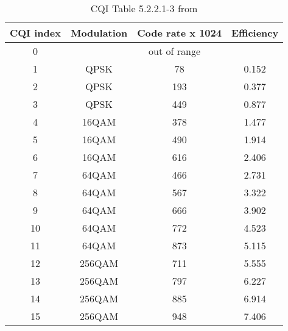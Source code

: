 \begin{table}[h]
    \centering
    \caption{\ac{CQI} Table 5.2.2.1-3 from \cite{3gpp-codebooks}}
    \label{tab:mcs}
    \begin{tabular}{|c|c|c|c|}
    \hline
    {\textbf{CQI index}} & {\textbf{Modulation}} & { \textbf{Code rate x 1024}} & {\textbf{Efficiency}} \\ \hline
    0                                      & \multicolumn{3}{c|}{out of range}                                                                         \\ \hline
    1  & QPSK   & 78  & 0.152  \\ \hline
    2  & QPSK   & 193 & 0.377   \\ \hline
    3  & QPSK   & 449 & 0.877   \\ \hline
    4  & 16QAM  & 378 & 1.477 \\ \hline
    5  & 16QAM  & 490 & 1.914 \\ \hline
    6  & 16QAM  & 616 & 2.406 \\ \hline
    7  & 64QAM  & 466 & 2.731 \\ \hline
    8  & 64QAM  & 567 & 3.322 \\ \hline
    9  & 64QAM  & 666 & 3.902 \\ \hline
    10 & 64QAM  & 772 & 4.523 \\ \hline
    11 & 64QAM  & 873 & 5.115 \\ \hline
    12 & 256QAM & 711 & 5.555 \\ \hline
    13 & 256QAM & 797 & 6.227 \\ \hline
    14 & 256QAM & 885 & 6.914 \\ \hline
    15 & 256QAM & 948 & 7.406 \\ \hline
    \end{tabular}
\end{table}


